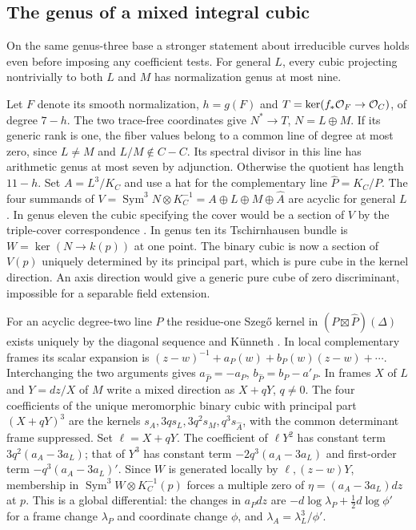 \subsection{The genus of a mixed integral cubic}\label{sec:szego}
On the same genus-three base a stronger statement about irreducible
curves holds even before imposing any coefficient tests. For general
$L$, every cubic projecting nontrivially to both $L$ and $M$ has
normalization genus at most nine.

Let $F$ denote its smooth normalization, $h=g(F)$ and
$T=\ker(f_*\mathcal O_F\to\mathcal O_C)$, of degree $7-h$. The two trace-free
coordinates give $N^*\to T$, $N=L\oplus M$. If its generic rank is
one, the fiber values belong to a common line of degree at most zero,
since $L\ne M$ and $L/M\notin C-C$. Its spectral divisor in this
line has arithmetic genus at most seven by adjunction. Otherwise
the quotient has length $11-h$. Set $A=L^3/K_C$ and use a hat for
the complementary line $\widehat P=K_C/P$. The four summands of
$V=\operatorname{Sym}^3N\otimes K_C^{-1}=A\oplus L\oplus M\oplus\widehat A$
are acyclic for general $L$. In genus eleven the cubic specifying
the cover would be a section of $V$ by the triple-cover
correspondence \cite[Sections~3--4]{Miranda}. In genus ten its
Tschirnhausen bundle is $W=\ker(N\to k(p))$ at one point. The
binary cubic is now a section of $V(p)$ uniquely determined by its
principal part, which is pure cube in the kernel direction.
An axis direction would give a generic pure cube of zero discriminant,
impossible for a separable field extension.

For an acyclic degree-two line $P$ the residue-one Szeg\H{o} kernel
in $(P\boxtimes\widehat P)(\Delta)$ exists uniquely by the diagonal
sequence and K\"unneth \cite{BB}. In local complementary frames its
scalar expansion is
$(z-w)^{-1}+a_P(w)+b_P(w)(z-w)+\cdots$.
Interchanging the two arguments gives
$a_{\widehat P}=-a_P$, $b_{\widehat P}=b_P-a'_P$.
In frames $X$ of $L$ and $Y=dz/X$ of $M$ write a mixed direction
as $X+qY$, $q\ne0$. The four coefficients of the unique meromorphic
binary cubic with principal part $(X+qY)^3$ are the kernels
$s_A,3qs_L,3q^2s_M,q^3s_{\widehat A}$, with the common determinant
frame suppressed. Set $\ell=X+qY$. The coefficient of $\ell Y^2$
has constant term $3q^2(a_A-3a_L)$; that of $Y^3$ has constant term
$-2q^3(a_A-3a_L)$ and first-order term $-q^3(a_A-3a_L)'$.
Since $W$ is generated locally by $\ell,(z-w)Y$, membership in
$\operatorname{Sym}^3W\otimes K_C^{-1}(p)$ forces a multiple zero
of $\eta=(a_A-3a_L)dz$ at $p$. This is a global differential: the
changes in $a_Pdz$ are $-d\log\lambda_P+
\tfrac12d\log\phi'$ for a frame change $\lambda_P$ and coordinate
change $\phi$, and $\lambda_A=\lambda_L^3/\phi'$.

